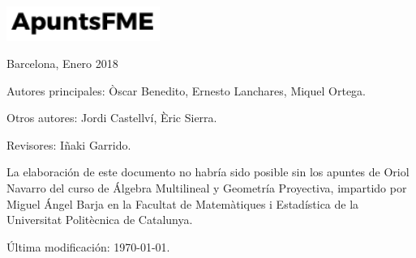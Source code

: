 \begin{titlepage}
    \vspace{1\baselineskip} %


    \vspace{2\baselineskip} %


    \vfill %


    \includegraphics[width=5cm]{../logo.pdf}

    \vspace{0.3\baselineskip} %
     
    Barcelona, Enero 2018



\end{titlepage}

\vspace*{\fill}

\noindent Autores principales: Òscar Benedito, Ernesto Lanchares, Miquel Ortega.

\quad

\noindent Otros autores: Jordi Castellví, Èric Sierra.

\quad

\noindent Revisores: Iñaki Garrido.

\quad

\noindent La elaboración de este documento no habría sido posible sin los apuntes de Oriol Navarro del curso de Álgebra Multilineal y Geometría Proyectiva, impartido por Miguel Ángel Barja en la Facultat de Matemàtiques i Estadística de la Universitat Politècnica de Catalunya.

\quad

\noindent Última modificación: \today.

\doclicenseThis
